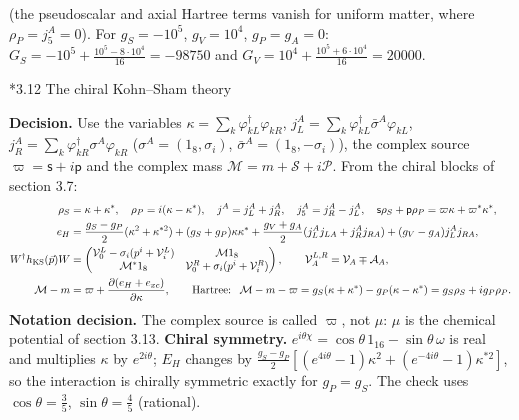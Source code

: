\documentclass[10pt,a4paper]{article}
\makeatletter
\renewcommand\subsection{\@startsection{subsection}{2}{\z@}{-3.25ex\@plus -1ex \@minus -.2ex}{1.5ex \@plus .2ex}{\normalfont\large\bfseries\raggedright}}
\makeatother
\begin{document}
(the pseudoscalar and axial Hartree terms vanish for uniform matter, where $\rho_P=j_5^A=0$). For $g_S=-10^5$, $g_V=10^4$, $g_P=g_A=0$: $G_S=-10^5+\frac{10^5-8\cdot10^4}{16}=-98750$ and $G_V=10^4+\frac{10^5+6\cdot10^4}{16}=20000$.

\subsection*{3.12 The chiral Kohn–Sham theory}
\textbf{Decision.} Use the variables $\kappa=\sum_k\varphi_{kL}^\dagger\varphi_{kR}$, $j_L^A=\sum_k\varphi_{kL}^\dagger\bar\sigma^A\varphi_{kL}$, $j_R^A=\sum_k\varphi_{kR}^\dagger\sigma^A\varphi_{kR}$ ($\sigma^A=(1_8,\sigma_i)$, $\bar\sigma^A=(1_8,-\sigma_i)$), the complex source $\varpi=\mathsf s+i\mathsf p$ and the complex mass $\mathcal M=m+\mathcal S+i\mathcal P$. From the chiral blocks of section 3.7:
\begin{align*}
\rho_S&=\kappa+\kappa^*,\quad \rho_P=i(\kappa-\kappa^*),\quad j^A=j_L^A+j_R^A,\quad j_5^A=j_R^A-j_L^A,\quad \mathsf s\rho_S+\mathsf p\rho_P=\varpi\kappa+\varpi^*\kappa^*, \\
e_H&=\frac{g_S-g_P}2(\kappa^2+\kappa^{*2})+(g_S+g_P)\kappa\kappa^*+\frac{g_V+g_A}2(j_L^Aj_{LA}+j_R^Aj_{RA})+(g_V-g_A)j_L^Aj_{RA}, \\
W^\dagger h_{\rm KS}(\vec p)W&=\begin{pmatrix}\mathcal V^L_0-\sigma_i(p^i+\mathcal V^L_i)&\mathcal M1_8\\ \mathcal M^*1_8&\mathcal V^R_0+\sigma_i(p^i+\mathcal V^R_i)\end{pmatrix},\qquad \mathcal V^{L,R}_A=\mathcal V_A\mp\mathcal A_A, \\
\mathcal M-m&=\varpi+\frac{\partial(e_H+e_{xc})}{\partial\kappa},\qquad \text{Hartree: }\ \mathcal M-m-\varpi=g_S(\kappa+\kappa^*)-g_P(\kappa-\kappa^*)=g_S\rho_S+ig_P\rho_P .
\end{align*}
\textbf{Notation decision.} The complex source is called $\varpi$, not $\mu$: $\mu$ is the chemical potential of section 3.13. \textbf{Chiral symmetry.} $e^{i\theta\chi}=\cos\theta\,1_{16}-\sin\theta\,\omega$ is real and multiplies $\kappa$ by $e^{2i\theta}$; $E_H$ changes by $\frac{g_S-g_P}2[(e^{4i\theta}-1)\kappa^2+(e^{-4i\theta}-1)\kappa^{*2}]$, so the interaction is chirally symmetric exactly for $g_P=g_S$. The check uses $\cos\theta=\frac35$, $\sin\theta=\frac45$ (rational).
\end{document}
